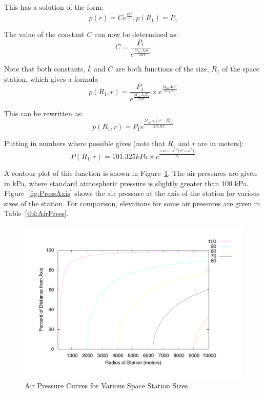 \documentclass[10pt, openany]{article}
\begin{document}
This has a solution of the form:
\begin{equation}\label{eq:Solution}
p(r) = Ce^{\frac{kr^{2}}{2}}, p(R_{1}) = P_{1}
\end{equation}

The value of the constant $C$ can now be determined as:
\begin{equation}\label{eq:SolConst}
C=\frac{P_{1}}{e^{\frac{M_{air}A_{0}R_{1}}{2RT}}}
\end{equation}

Note that both constants, $k$ and $C$ are both functions of the size, $R_{1}$ of the space station, which gives a formula
\begin{equation}\label{eq:SolR1r}
p(R_{1}, r) = \frac{P_{1}}{e^{\frac{M_{air}A_{0}R_{1}}{2RT}}} \times e^{\frac{M_{air}A_{0}r^{2}}{2R_{1}RT}}
\end{equation}

This can be rewritten as:
\begin{equation}\label{eq:SolMod}
p(R_{1}, r) = P_{1}e^{\frac{M_{air}A_{0}(r^{2}-R_{1}^{2})}{2R_{1}RT}}
\end{equation}

Putting in numbers where possible gives (note that $R_{1}$ and $r$ are in meters):
\begin{equation}\label{eq:SolNum}
P(R_{1}, r) = 101.325kPa\times e^{\frac{5.83 \times 10^{-5}(r^{2}-R_{1}^{2})}{R_{1}}}
\end{equation}


A contour plot of this function is shown in Figure~\ref{fig:PressContour}.  The air pressures are given in kPa, where standard atmospheric pressure is slightly greater than 100 kPa.  Figure~\ref{fig:PressAxis} shows the air pressure at the axis of the station for various sizes of the station.  For comparison, elevations for some air pressures are given in Table~\ref{tbl:AirPress}.

\begin{figure}[!ht] 
  \centering
  \includegraphics[scale=0.7]{fig1.pdf}
  \vspace{1ex}
  \caption{Air Pressure Curves for Various Space Station Sizes}
  \label{fig:PressContour}
\end{figure}
\end{document}
